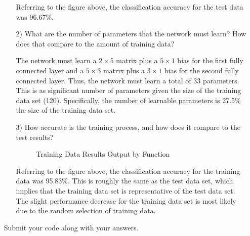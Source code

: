 \documentclass[fleqn]{article}
\begin{document}
\begin{enumerate}
\begin{enumerate}
			Referring to the figure above, the classification accuracy for the test data was 96.67\%.
			
			\item[2)] What are the number of parameters that the network must learn? How does that compare to the amount of training data?
			
			The network must learn a $2 \times 5$ matrix plus a $5 \times 1$ bias for the first fully connected layer and a $5 \times 3$ matrix plus a $3 \times 1$ bias for the second fully connected layer. Thus, the network must learn a total of 33 parameters. This is as significant number of parameters given the size of the training data set (120). Specifically, the number of learnable parameters is 27.5\% the size of the training data set. 
			
			\item[3)] How accurate is the training process, and how does it compare to the test results?
			
			\begin{figure}[H]
				\centerline{}
				\caption{Training Data Results Output by Function}
				\label{training_data_results}
			\end{figure}
		
			Referring to the figure above, the classification accuracy for the training data was 95.83\%. This is roughly the same as the test data set, which implies that the training data set is representative of the test data set. The slight performance decrease for the training data set is most likely due to the random selection of training data.
			
		\end{enumerate}
		
		Submit your code along with your answers.
	\end{enumerate}
\end{document}
